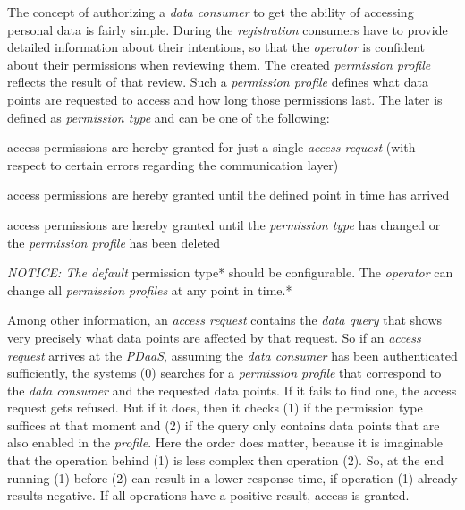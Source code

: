 \documentclass[12pt,english,a4paper,titlepage,cleardoublepage=empty,dottedtoc]{report}
\providecommand{\tightlist}{%
  \setlength{\itemsep}{0pt}\setlength{\parskip}{0pt}}
\begin{document}
The concept of authorizing a \emph{data consumer} to get the ability of
accessing personal data is fairly simple. During the \emph{registration}
consumers have to provide detailed information about their intentions,
so that the \emph{operator} is confident about their permissions when
reviewing them. The created \emph{permission profile} reflects the
result of that review. Such a \emph{permission profile} defines what
data points are requested to access and how long those permissions last.
The later is defined as \emph{permission type} and can be one of the
following:

\begin{description}
\tightlist
\item[\emph{one-time-only}]
access permissions are hereby granted for just a single \emph{access
request} (with respect to certain errors regarding the communication
layer)
\item[\emph{expires-on-date}]
access permissions are hereby granted until the defined point in time
has arrived
\item[\emph{until-further-notice}]
access permissions are hereby granted until the \emph{permission type}
has changed or the \emph{permission profile} has been deleted
\end{description}

\emph{NOTICE: The default }permission type* should be configurable. The
\emph{operator} can change all \emph{permission profiles} at any point
in time.*

Among other information, an \emph{access request} contains the
\emph{data query} that shows very precisely what data points are
affected by that request. So if an \emph{access request} arrives at the
\emph{PDaaS}, assuming the \emph{data consumer} has been authenticated
sufficiently, the systems (0) searches for a \emph{permission profile}
that correspond to the \emph{data consumer} and the requested data
points. If it fails to find one, the access request gets refused. But if
it does, then it checks (1) if the permission type suffices at that
moment and (2) if the query only contains data points that are also
enabled in the \emph{profile}. Here the order does matter, because it is
imaginable that the operation behind (1) is less complex then operation
(2). So, at the end running (1) before (2) can result in a lower
response-time, if operation (1) already results negative. If all
operations have a positive result, access is granted.
\end{document}
